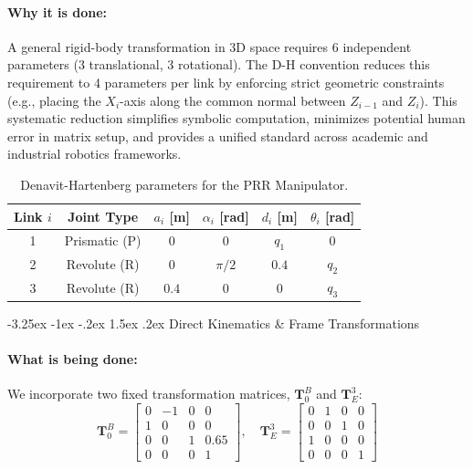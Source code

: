 \documentclass[11pt, a4paper]{article}
\makeatletter
\renewcommand{\subsection}{\@startsection{subsection}{2}{\z@}%
    {-3.25ex \@plus -1ex \@minus -.2ex}%
    {1.5ex \@plus .2ex}%
    {\normalfont\large\bfseries\color{brandaccent}}}
\makeatother
\begin{document}
\paragraph{Why it is done:}
A general rigid-body transformation in 3D space requires 6 independent parameters (3 translational, 3 rotational). The D-H convention reduces this requirement to 4 parameters per link by enforcing strict geometric constraints (e.g., placing the $X_i$-axis along the common normal between $Z_{i-1}$ and $Z_i$). This systematic reduction simplifies symbolic computation, minimizes potential human error in matrix setup, and provides a unified standard across academic and industrial robotics frameworks.

\begin{table}[h!]
\centering
\caption{Denavit-Hartenberg parameters for the PRR Manipulator.}
\label{tab:dh_table}
\begin{tabular}{cccccc}
\toprule
\textbf{Link} $i$ & \textbf{Joint Type} & $a_i$ [m] & $\alpha_i$ [rad] & $d_i$ [m] & $\theta_i$ [rad] \\
\midrule
1 & Prismatic (P) & $0$ & $0$ & $q_1$ & $0$ \\
2 & Revolute (R)  & $0$ & $\pi/2$ & $0.4$ & $q_2$ \\
3 & Revolute (R)  & $0.4$ & $0$ & $0$ & $q_3$ \\
\bottomrule
\end{tabular}
\end{table}

\subsection{Direct Kinematics \& Frame Transformations}
\paragraph{What is being done:}
We incorporate two fixed transformation matrices, $\mathbf{T}_0^B$ and $\mathbf{T}_E^3$:
\begin{equation}
\mathbf{T}_0^B = \begin{bmatrix}
0 & -1 & 0 & 0 \\
1 & 0 & 0 & 0 \\
0 & 0 & 1 & 0.65 \\
0 & 0 & 0 & 1
\end{bmatrix}, \quad
\mathbf{T}_E^3 = \begin{bmatrix}
0 & 1 & 0 & 0 \\
0 & 0 & 1 & 0 \\
1 & 0 & 0 & 0 \\
0 & 0 & 0 & 1
\end{bmatrix}
\end{equation}
\end{document}
